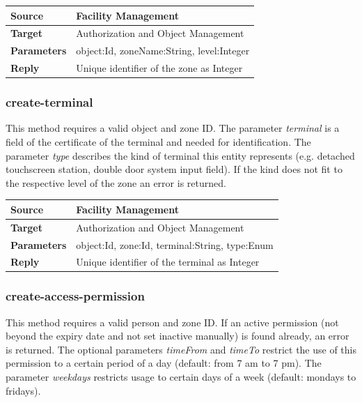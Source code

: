 \documentclass[12pt,a4paper,titlepage,oneside]{scrartcl}
\begin{document}
\begin{table}[h]
    \centering
    \begin{tabular}{|l|p{12cm}|} \hline
    \textbf{Source}&Facility Management\\ \hline
    \textbf{Target}&Authorization and Object Management\\ \hline
    \textbf{Parameters}&object:Id, zoneName:String, level:Integer\\ \hline
    \textbf{Reply}&Unique identifier of the zone as Integer\\ \hline
    \end{tabular}
\end{table}

\subsubsection{create-terminal}
This method requires a valid object and zone ID. The parameter \emph{terminal} is a field of the certificate of the terminal and needed for identification. The parameter \emph{type} describes the kind of terminal this entity represents (e.g. detached touchscreen station, double door system input field). If the kind does not fit to the respective level of the zone an error is returned.

\begin{table}[h]
    \centering
    \begin{tabular}{|l|p{12cm}|} \hline
    \textbf{Source}&Facility Management\\ \hline
    \textbf{Target}&Authorization and Object Management\\ \hline
    \textbf{Parameters}&object:Id, zone:Id, terminal:String, type:Enum\\ \hline
    \textbf{Reply}&Unique identifier of the terminal as Integer\\ \hline
    \end{tabular}
\end{table}

\subsubsection{create-access-permission}
This method requires a valid person and zone ID. If an active permission (not beyond the expiry date and not set inactive manually) is found already, an error is returned. The optional parameters \emph{timeFrom} and \emph{timeTo} restrict the use of this permission to a certain period of a day (default: from 7 am to 7 pm). The parameter \emph{weekdays} restricts usage to certain days of a week (default: mondays to fridays).
\end{document}

